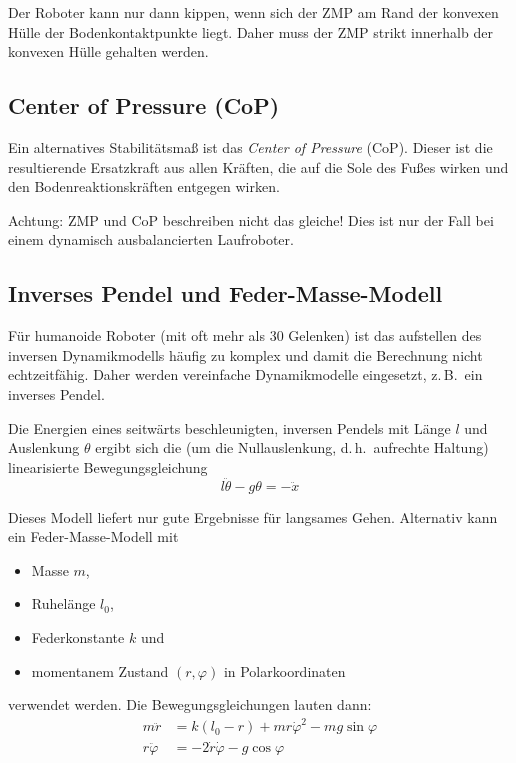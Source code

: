 \documentclass[a4paper, 11pt, accentcolor = tud3b]{tudreport}
\renewcommand{\dh}{d.\,h.~}
\newcommand{\zB}{z.\,B.~}
\begin{document}
				Der Roboter kann nur dann kippen, wenn sich der ZMP am Rand der konvexen Hülle der Bodenkontaktpunkte liegt. Daher muss der ZMP strikt innerhalb der konvexen Hülle gehalten werden.

			\subsection{Center of Pressure (CoP)}
				Ein alternatives Stabilitätsmaß ist das \emph{Center of Pressure} (CoP). Dieser ist die resultierende Ersatzkraft aus allen Kräften, die auf die Sole des Fußes wirken und den Bodenreaktionskräften entgegen wirken.
				
				Achtung: ZMP und CoP beschreiben nicht das gleiche! Dies ist nur der Fall bei einem dynamisch ausbalancierten Laufroboter.

			\subsection{Inverses Pendel und Feder-Masse-Modell}
				Für humanoide Roboter (mit oft mehr als \num{30} Gelenken) ist das aufstellen des inversen Dynamikmodells häufig zu komplex und damit die Berechnung nicht echtzeitfähig. Daher werden vereinfache Dynamikmodelle eingesetzt, \zB ein inverses Pendel.
				
				Die Energien eines seitwärts beschleunigten, inversen Pendels mit Länge \(l\) und Auslenkung \(\theta\) ergibt sich die (um die Nullauslenkung, \dh aufrechte Haltung) linearisierte Bewegungsgleichung
				\begin{equation*}
					l \ddot{\theta} - g \theta = -\ddot{x}
				\end{equation*}
				
				Dieses Modell liefert nur gute Ergebnisse für langsames Gehen. Alternativ kann ein Feder-Masse-Modell mit
				\begin{itemize}
					\item Masse \(m\),
					\item Ruhelänge \(l_0\),
					\item Federkonstante \(k\) und
					\item momentanem Zustand \( (r, \varphi) \) in Polarkoordinaten
				\end{itemize}
				verwendet werden. Die Bewegungsgleichungen lauten dann:
				\begin{align*}
					m\ddot{r} &= k(l_0 - r) + mr\dot{\varphi}^2 - mg\sin\varphi \\
					r\ddot{\varphi} &= -2\dot{r}\dot{\varphi} - g\cos\varphi
				\end{align*}
			
\end{document}
